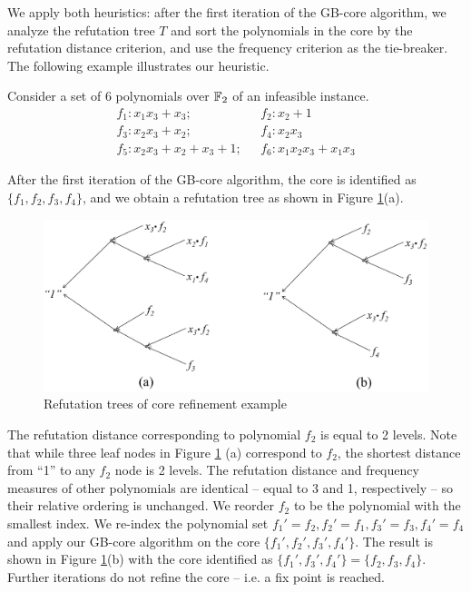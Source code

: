 
We apply both heuristics: after the first iteration of the GB-core
algorithm, we analyze the refutation tree $T$ and sort the polynomials
in the core by the refutation distance criterion, and use the
frequency criterion as the tie-breaker. The following example
illustrates our heuristic.  


\begin{Example} 
Consider a set of 6 polynomials over ${\mathbb{F}}_2$ of an
infeasible instance.
\begin{align*}
f_1: x_1x_3+x_3; & ~~~f_2: x_2 + 1\\
f_3: x_2x_3+x_2; & ~~~f_4: x_2x_3\\
f_5: x_2x_3 + x_2 + x_3 + 1; & ~~~f_6 : x_1x_2x_3 +x_1x_3
\end{align*}

After the first iteration of the GB-core algorithm, the core is
identified as $\{f_1, f_2,f_3,f_4\}$, and we obtain a
refutation tree as shown in Figure \ref{fig:refine}(a).  
\begin{figure}[hbt]
\centering
\includegraphics[width=\textwidth]{newfig/core_refine.eps}
\caption{Refutation trees of core refinement example}
\label{fig:refine}
\end{figure}

The refutation distance corresponding to polynomial $f_2$ is equal to
2 levels. Note that while three leaf nodes in Figure \ref{fig:refine} (a)
correspond to $f_2$, the shortest distance from ``1'' to any $f_2$
node is 2 levels. The refutation distance and frequency measures of
other polynomials are identical -- equal to 3 and 1, respectively --
so their relative ordering is unchanged. We reorder $f_2$ to be the
polynomial with the  smallest index. We re-index the polynomial set 
$f_1'=f_2, f_2' = f_1, f_3' = f_3, f_4' = f_4$
and apply our GB-core algorithm on the core
$\{f_1',f_2',f_3',f_4'\}$. The result is shown in
Figure \ref{fig:refine}(b) with the core identified as $\{f_1', f_3',
f_4'\} = \{f_2,f_3,f_4\}$. Further iterations do not refine the core
-- i.e. a fix point is reached. 
\end{Example}

